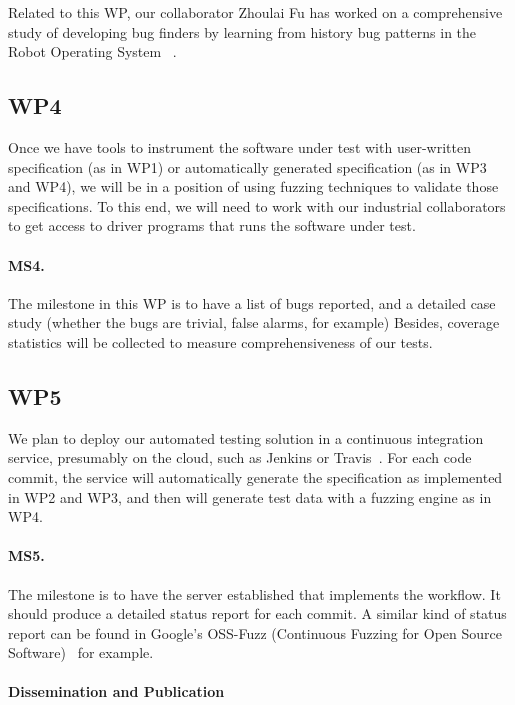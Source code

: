 \documentclass[fleqn,12pt]{article}
\begin{document}
Related to this WP, our collaborator Zhoulai Fu has worked on a comprehensive study of developing bug finders by learning from history bug patterns in the Robot Operating System~\cite{nielsenFSW2020dependencybugs} .



\subsection{WP4} Once we have tools to instrument the software under test with user-written
specification (as in WP1) or automatically generated specification (as
in WP3 and WP4), we will be in a position of using fuzzing techniques
to validate those specifications. To this end, we will need to work
with our industrial collaborators to get access to driver programs
that runs the software under test. 

\paragraph{MS4.} The milestone in this WP is to have a list of bugs reported, and a detailed case study (whether the bugs are
trivial, false alarms, for example) Besides, coverage statistics will  be
collected to measure comprehensiveness of our tests. 

\subsection{WP5} We plan to deploy our automated testing solution  in a continuous
integration service, presumably on the cloud, such as Jenkins or
Travis~\cite{DBLP:journals/tse/GallabaM20}. For each code commit, the
service will automatically generate the specification as implemented
in WP2 and WP3, and then will generate test data with a fuzzing engine
as in WP4.

\paragraph{MS5.} The milestone is to have the server established that implements
the workflow. It should produce a detailed status report for each
commit.  A similar kind of status report can be found in Google's
OSS-Fuzz (Continuous Fuzzing for Open Source
Software)~\cite{web:oss-fuzz} for example.


\paragraph*{Dissemination and Publication}
\end{document}
